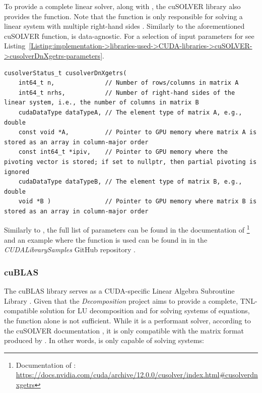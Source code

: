 To provide a complete linear solver, along with , the cuSOLVER library also provides the  function. Note that the function is only responsible for solving a linear system with multiple right-hand sides \cite{5D33zKi5iStCty0r}. Similarly to the aforementioned cuSOLVER function,  is data-agnostic. For a selection of input parameters for  see Listing~\ref{Listing:implementation->libraries-used->CUDA-libraries->cuSOLVER->cusolverDnXgetrs-parameters}.

\begin{lstlisting}[caption={The function declaration of \code{cusolverDnXgetrs()} with a selection of parameters. Note that matrix \code{A} should adhere to the format of the matrix produced by \code{cusolverDnXgetrf()} \cite{5D33zKi5iStCty0r}.},label={Listing:implementation->libraries-used->CUDA-libraries->cuSOLVER->cusolverDnXgetrs-parameters}]
cusolverStatus_t cusolverDnXgetrs(
	int64_t n,              // Number of rows/columns in matrix A
	int64_t nrhs,           // Number of right-hand sides of the linear system, i.e., the number of columns in matrix B
	cudaDataType dataTypeA, // The element type of matrix A, e.g., double
	const void *A,          // Pointer to GPU memory where matrix A is stored as an array in column-major order
	const int64_t *ipiv,    // Pointer to GPU memory where the pivoting vector is stored; if set to nullptr, then partial pivoting is ignored
	cudaDataType dataTypeB, // The element type of matrix B, e.g., double
	void *B )               // Pointer to GPU memory where matrix B is stored as an array in column-major order
\end{lstlisting}

Similarly to , the full list of parameters can be found in the documentation of \footnote{Documentation of : \url{https://docs.nvidia.com/cuda/archive/12.0.0/cusolver/index.html\#cusolverdnxgetrs}} \cite{5D33zKi5iStCty0r} and an example where the function is used can be found in  in the \textit{CUDALibrarySamples} GitHub repository \cite{Nicely2023}.

\subsubsection{cuBLAS}\label{Subsection:implementation->libraries-used->CUDA-libraries->cuBLAS}
The cuBLAS library serves as a CUDA-specific Linear Algebra Subroutine Library \cite{h9oJtLLHaTFaL3ME}. Given that the \textit{Decomposition} project aims to provide a complete, TNL-compatible solution for LU decomposition and for solving systems of equations, the  function alone is not sufficient. While it is a performant solver, according to the cuSOLVER documentation \cite{5D33zKi5iStCty0r}, it is only compatible with the matrix format produced by . In other words,  is only capable of solving systems:


